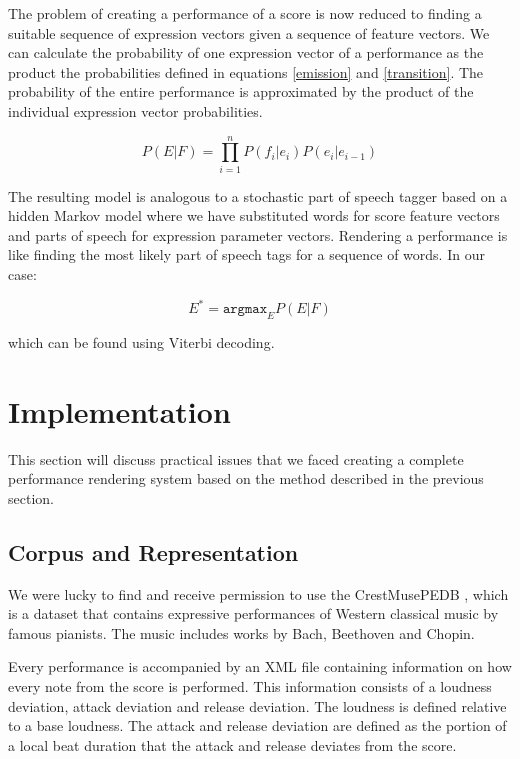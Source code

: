 \documentclass[a4paper,10pt]{article}
\begin{document}
The problem of creating a performance of a score is now reduced to finding a suitable sequence of expression vectors given a sequence of feature vectors. We can calculate the probability of one expression vector of a performance as the product the probabilities defined in equations \ref{emission} and \ref{transition}. The probability of the entire performance is approximated by the product of the individual expression vector probabilities.

\begin{equation}
P(E|F) = \displaystyle\prod_{i=1}^{n}P(f_i|e_i)P(e_i|e_{i-1})
\end{equation}

The resulting model is analogous to a stochastic part of speech tagger based on a hidden Markov model where we have substituted words for score feature vectors and parts of speech for expression parameter vectors. Rendering a performance is like finding the most likely part of speech tags for a sequence of words. In our case:

\[E^* = \texttt{argmax}_E P(E|F)\]

which can be found using Viterbi decoding.

\section{Implementation}
\label{sec:implementation}

This section will discuss practical issues that we faced creating a complete performance rendering system based on the method described in the previous section.

\subsection{Corpus and Representation}
\label{sec:corpus}
We were lucky to find and receive permission to use the CrestMusePEDB \cite{hashida2008new}, which is a dataset that contains expressive performances of Western classical music by famous pianists. The music includes works by Bach, Beethoven and Chopin.

Every performance is accompanied by an XML file containing information on how every note from the score is performed. This information consists of a loudness deviation, attack deviation and release deviation. The loudness is defined relative to a base loudness. The attack and release deviation are defined as the portion of a local beat duration that the attack and release deviates from the score. 
\end{document}
